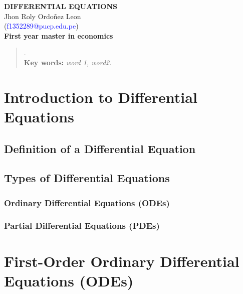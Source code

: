 \documentclass[11pt]{article}
\begin{document}
	\begin{titlepage}
		\vspace*{5cm}
		{\Large
			\begin{center}
				{\Huge \textbf{DIFFERENTIAL EQUATIONS}}
				\vspace{0.5cm}\\
				Jhon Roly Ordoñez Leon\\
				(\textcolor{blue}{f1352289@pucp.edu.pe})
				\vspace{0.5cm}\\
				\textbf{First year master in economics}
			\end{center}
		}
		\date{\today}
		\begin{abstract}
			\lipsum[1].\\
			\textbf{Key words:} \hspace{1mm} \textit{word 1, word2.}
		\end{abstract}
		\textcolor{red}{\tableofcontents}
	\end{titlepage}

	\section{Introduction to Differential Equations}
		\lipsum[1]
		\subsection{Definition of a Differential Equation}
			\lipsum[1]
		\subsection{Types of Differential Equations}
			\lipsum[1]
			\subsubsection{Ordinary Differential Equations (ODEs)}
				\lipsum[1]
			\subsubsection{Partial Differential Equations (PDEs)}
				\lipsum[1]
	\section{First-Order Ordinary Differential Equations (ODEs)}
		\lipsum[1]
\end{document}
